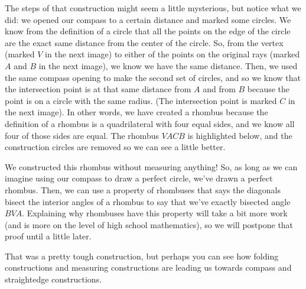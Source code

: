 \documentclass{ximera}
\begin{document}
The steps of that construction might seem a little mysterious, but notice what we did: we opened our compass to a certain distance and marked some circles. We know from the definition of a circle that all the points on the edge of the circle are the exact same distance from the center of the circle. So, from the vertex (marked $V$ in the next image) to either of  the points on the original rays (marked $A$ and $B$ in the next image), we know we have the same distance. Then, we used the same compass opening to make the second set of circles, and so we know that the intersection point is at that same distance from $A$ and from $B$ because the point is on a circle with the same radius. (The intersection point is marked $C$ in the next image). In other words, we have created a rhombus because the definition of a rhombus is a quadrilateral with four equal sides, and we know all four of those sides are equal. The rhombus $VACB$ is highlighted below, and the construction circles are removed so we can see a little better.

\begin{image}
\end{image}

We constructed this rhombus without measuring anything! So, as long as we can imagine using our compass to draw a perfect circle, we've drawn a perfect rhombus. Then, we can use a property of rhombuses that says the diagonals bisect the interior angles of a rhombus to say that we've exactly bisected angle $BVA$. Explaining why rhombuses have this property will take a bit more work (and is more on the level of high school mathematics), so we will postpone that proof until a little later.

That was a pretty tough construction, but perhaps you can see how folding constructions and measuring constructions are leading us towards compass and straightedge constructions.
\end{document}

